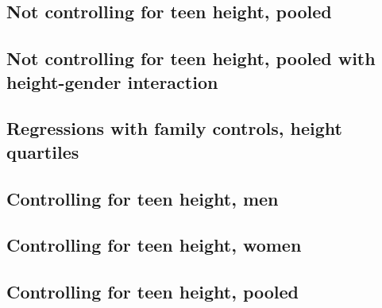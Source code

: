 \begin{landscape}
\subsection{Not controlling for teen height, pooled}

\end{landscape}

\begin{landscape}
\subsection{Not controlling for teen height, pooled with height-gender interaction}

\end{landscape}


\begin{landscape}
\section{Regressions with family controls, height quartiles}
\subsection{Controlling for teen height, men}

\end{landscape}

\begin{landscape}
\subsection{Controlling for teen height, women}

\end{landscape}

\begin{landscape}
\subsection{Controlling for teen height, pooled}

\end{landscape}

